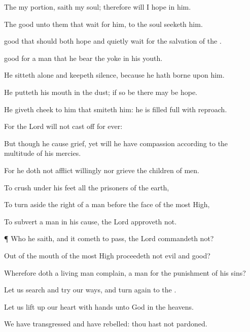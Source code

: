 {The
{}
{} my
portion,
saith my
soul; therefore will I
hope in him.

The
{}
{}
good unto them that
wait for him, to the
soul
{}
seeketh him.

good that
{} should both
hope and quietly
wait for the
salvation of the
{}.

good for a
man that he
bear the
yoke in his
youth.

He
sitteth
alone and keepeth
silence, because he hath
borne
{} upon him.

He
putteth his
mouth in the
dust; if so be there may
be
hope.

He
giveth
{}
cheek to him that
smiteth him: he is filled
full with
reproach.

For the
Lord will not cast
off for
ever:

But though he cause
grief, yet will he have
compassion according to the
multitude of his
mercies.

For he doth not
afflict
willingly nor
grieve the
children of
men.

To
crush under his
feet all the
prisoners of the
earth,

To turn
aside the
right of a
man before the
face of the most
High,

To
subvert a
man in his
cause, the
Lord
approveth not.


\par }{\PP {}¶ Who
{} he
{}
saith, and it cometh to pass,
{} the
Lord
commandeth
{} not?

Out of the
mouth of the most
High
proceedeth not
evil and
good?

Wherefore doth a
living
man
complain, a
man for the punishment of his
sins?

Let us
search and
try our
ways, and turn
again to the
{}.

Let us lift
up our
heart with
{}
hands unto
God in the
heavens.


\par }{\PP {}We have
transgressed and have
rebelled: thou hast not
pardoned.

}
